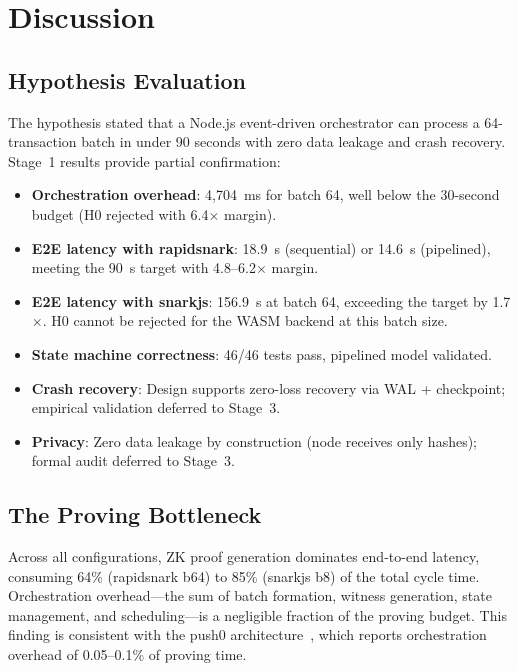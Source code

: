
\section{Discussion}

\subsection{Hypothesis Evaluation}

The hypothesis stated that a Node.js event-driven orchestrator can process
a 64-transaction batch in under 90 seconds with zero data leakage and crash
recovery. Stage~1 results provide partial confirmation:

\begin{itemize}
\item \textbf{Orchestration overhead}: 4,704~ms for batch 64, well below
  the 30-second budget (H0 rejected with 6.4$\times$ margin).

\item \textbf{E2E latency with rapidsnark}: 18.9~s (sequential) or 14.6~s
  (pipelined), meeting the 90~s target with 4.8--6.2$\times$ margin.

\item \textbf{E2E latency with snarkjs}: 156.9~s at batch 64, exceeding
  the target by 1.7$\times$. H0 cannot be rejected for the WASM backend
  at this batch size.

\item \textbf{State machine correctness}: 46/46 tests pass, pipelined
  model validated.

\item \textbf{Crash recovery}: Design supports zero-loss recovery via
  WAL + checkpoint; empirical validation deferred to Stage~3.

\item \textbf{Privacy}: Zero data leakage by construction (node receives
  only hashes); formal audit deferred to Stage~3.
\end{itemize}

\subsection{The Proving Bottleneck}

Across all configurations, ZK proof generation dominates end-to-end latency,
consuming 64\% (rapidsnark b64) to 85\% (snarkjs b8) of the total cycle
time. Orchestration overhead---the sum of batch formation, witness
generation, state management, and scheduling---is a negligible fraction
of the proving budget. This finding is consistent with the push0
architecture~\cite{push0_2025orchestration}, which reports orchestration
overhead of 0.05--0.1\% of proving time.

